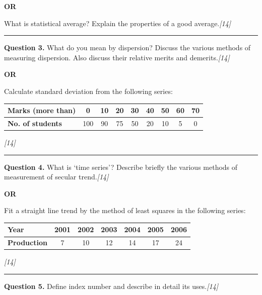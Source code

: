 \documentclass[11pt,a4paper]{article}
\newcommand{\pts}[1]{\hfill   \textit{[#1]}}
\begin{document}
\centerline{   \textbf{OR}}

What is statistical average? Explain the properties of a good average.\pts{14}

\medskip\rule{\linewidth}{0.2pt}




\noindent   \textbf{Question 3.}
What do you mean by dispersion? Discuss the various methods of measuring dispersion. Also discuss their relative merits and demerits.\pts{14}

\centerline{   \textbf{OR}}

Calculate standard deviation from the following series:


\begin{center}
\small

\begin{tabular}{|l|c|c|c|c|c|c|c|c|}
\hline
   \textbf{Marks (more than)} & 0 & 10 & 20 & 30 & 40 & 50 & 60 & 70 \\
\hline
   \textbf{No. of students} & 100 & 90 & 75 & 50 & 20 & 10 & 5 & 0 \\
\hline
\end{tabular}
\end{center}\pts{14}

\medskip\rule{\linewidth}{0.2pt}

\pagebreak




\noindent   \textbf{Question 4.}
What is `time series'? Describe briefly the various methods of measurement of secular trend.\pts{14}

\centerline{   \textbf{OR}}

Fit a straight line trend by the method of least squares in the following series:


\begin{center}
\small

\begin{tabular}{|l|c|c|c|c|c|c|}
\hline
   \textbf{Year} & 2001 & 2002 & 2003 & 2004 & 2005 & 2006 \\
\hline
   \textbf{Production} & 7 & 10 & 12 & 14 & 17 & 24 \\
\hline
\end{tabular}
\end{center}\pts{14}

\medskip\rule{\linewidth}{0.2pt}




\noindent   \textbf{Question 5.}
Define index number and describe in detail its uses.\pts{14}
\end{document}
